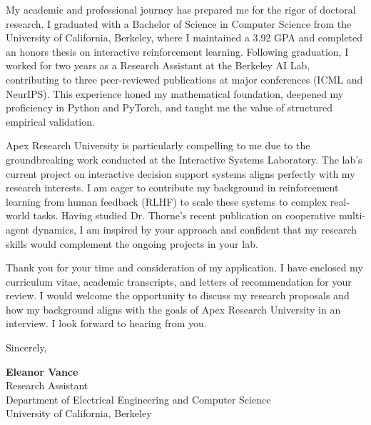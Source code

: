 \documentclass[11pt,letterpaper]{article}
\newcommand{\paragraphspace}{\vspace{0.6em}}
\begin{document}
\paragraphspace
My academic and professional journey has prepared me for the rigor of doctoral research. I graduated with a Bachelor of Science in Computer Science from the University of California, Berkeley, where I maintained a 3.92 GPA and completed an honors thesis on interactive reinforcement learning. Following graduation, I worked for two years as a Research Assistant at the Berkeley AI Lab, contributing to three peer-reviewed publications at major conferences (ICML and NeurIPS). This experience honed my mathematical foundation, deepened my proficiency in Python and PyTorch, and taught me the value of structured empirical validation.

\paragraphspace
Apex Research University is particularly compelling to me due to the groundbreaking work conducted at the Interactive Systems Laboratory. The lab's current project on interactive decision support systems aligns perfectly with my research interests. I am eager to contribute my background in reinforcement learning from human feedback (RLHF) to scale these systems to complex real-world tasks. Having studied Dr. Thorne's recent publication on cooperative multi-agent dynamics, I am inspired by your approach and confident that my research skills would complement the ongoing projects in your lab.

\paragraphspace
Thank you for your time and consideration of my application. I have enclosed my curriculum vitae, academic transcripts, and letters of recommendation for your review. I would welcome the opportunity to discuss my research proposals and how my background aligns with the goals of Apex Research University in an interview. I look forward to hearing from you.

\vspace{1.0em}
Sincerely,

\vspace{1.8em}
{\bfseries\color{primary} Eleanor Vance} \\
Research Assistant \\
Department of Electrical Engineering and Computer Science \\
University of California, Berkeley
\end{document}
